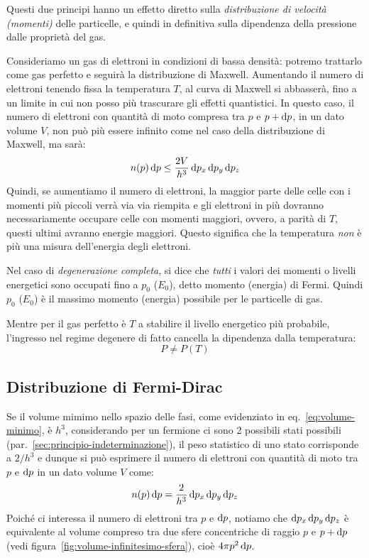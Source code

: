 Questi due principi hanno un effetto diretto sulla \emph{distribuzione di velocità (momenti)} delle particelle, e quindi in definitiva sulla dipendenza della pressione dalle proprietà del gas. 

Consideriamo un gas di elettroni in condizioni di bassa densità: potremo trattarlo come gas perfetto e seguirà la distribuzione di Maxwell. Aumentando il numero di elettroni tenendo fissa la temperatura $T$, al curva di Maxwell si abbasserà, fino a un limite in cui non posso più trascurare gli effetti quantistici. In questo caso, il numero di elettroni con quantità di moto compresa tra $p$ e $p + \mathop{\mathrm{{}d}}\mathopen{} p$, in  un dato volume $V$, non può più essere infinito come nel caso della distribuzione di Maxwell, ma sarà:
\[
n(p) \mathop{\mathrm{{}d}}\mathopen{} p \leq \frac{2V}{h^3} \mathop{\mathrm{{}d}}\mathopen{} p_x \mathop{\mathrm{{}d}}\mathopen{} p_y \mathop{\mathrm{{}d}}\mathopen{} p_z
\]
Quindi, se aumentiamo il numero di elettroni, la maggior parte delle celle con i momenti più piccoli verrà via via riempita e gli elettroni in più dovranno necessariamente occupare celle con momenti maggiori, ovvero, a parità di $T$, questi ultimi avranno energie maggiori. Questo significa che la temperatura \emph{non} è più una misura dell'energia degli elettroni. 

Nel caso di \emph{degenerazione completa}, si dice che \emph{tutti}
i valori dei momenti o livelli energetici sono occupati fino a $p_0$ ($E_0$), detto momento (energia) di Fermi. Quindi $p_0$ ($E_0$) è il massimo momento (energia) possibile per le particelle di gas. 

Mentre per il gas perfetto è $T$ a stabilire il livello energetico più probabile, l'ingresso nel regime degenere di fatto cancella la dipendenza dalla temperatura:
\[
P \neq P(T)
\]

\subsection{Distribuzione di Fermi-Dirac}
Se il volume mimimo nello spazio delle fasi, come evidenziato in eq.~\eqref{eq:volume-minimo}, è $h^3$, considerando per un fermione ci sono 2 possibili stati possibili (par.~\ref{sec:principio-indeterminazione}), il peso statistico di uno stato corrisponde a $2 / h^3$ e dunque si può esprimere il numero di elettroni con quantità di moto tra $p$ e $\mathop{\mathrm{{}d}}\mathopen{} p$ in un dato volume $V$ come:
\[
n(p) \mathop{\mathrm{{}d}}\mathopen{} p = \frac{2}{h^3} \mathop{\mathrm{{}d}}\mathopen{} p_x \mathop{\mathrm{{}d}}\mathopen{} p_y \mathop{\mathrm{{}d}}\mathopen{} p_z
\]
Poiché ci interessa il numero di elettroni tra $p$ e $\mathop{\mathrm{{}d}}\mathopen{} p$, notiamo che $\mathop{\mathrm{{}d}}\mathopen{} p_x \mathop{\mathrm{{}d}}\mathopen{} p_y \mathop{\mathrm{{}d}}\mathopen{} p_z$ è equivalente al volume compreso tra due sfere concentriche di raggio $p$ e $p + \mathop{\mathrm{{}d}}\mathopen{} p$ (vedi figura~\ref{fig:volume-infinitesimo-sfera}), cioè $4 \pi p^2 \mathop{\mathrm{{}d}}\mathopen{} p$. 

